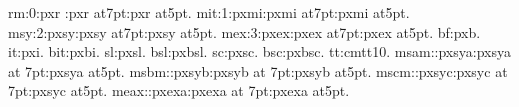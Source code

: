 \newfont      rm:0:pxr :pxr  at7pt:pxr  at5pt.
\newmathfont mit:1:pxmi:pxmi at7pt:pxmi at5pt.
\newmathfont msy:2:pxsy:pxsy at7pt:pxsy at5pt.
\newmathfont mex:3:pxex:pxex at7pt:pxex at5pt.
\newtextfont  bf:pxb.
\newtextfont  it:pxi.
\newtextfont bit:pxbi.
\newtextfont  sl:pxsl.
\newtextfont bsl:pxbsl.
\newtextfont  sc:pxsc.
\newtextfont bsc:pxbsc.
\newtextfont  tt:cmtt10.
\newfam\msam \newfam\msbm \newfam\mscm \newfam\meax
\newmathfont msam:\msam:pxsya:pxsya at 7pt:pxsya at5pt.
\newmathfont msbm:\msbm:pxsyb:pxsyb at 7pt:pxsyb at5pt.
\newmathfont mscm:\mscm:pxsyc:pxsyc at 7pt:pxsyc at5pt.
\newmathfont meax:\meax:pxexa:pxexa at 7pt:pxexa at5pt.
\rm

